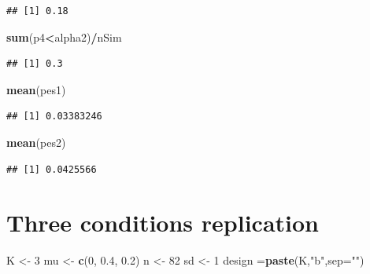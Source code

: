 \documentclass[]{book}
\newenvironment{Shaded}{\begin{snugshade}}{\end{snugshade}}
\newcommand{\DataTypeTok}[1]{\textcolor[rgb]{0.13,0.29,0.53}{#1}}
\newcommand{\DecValTok}[1]{\textcolor[rgb]{0.00,0.00,0.81}{#1}}
\newcommand{\FloatTok}[1]{\textcolor[rgb]{0.00,0.00,0.81}{#1}}
\newcommand{\KeywordTok}[1]{\textcolor[rgb]{0.13,0.29,0.53}{\textbf{#1}}}
\newcommand{\NormalTok}[1]{#1}
\newcommand{\OperatorTok}[1]{\textcolor[rgb]{0.81,0.36,0.00}{\textbf{#1}}}
\newcommand{\StringTok}[1]{\textcolor[rgb]{0.31,0.60,0.02}{#1}}
\begin{document}
\begin{verbatim}
## [1] 0.18
\end{verbatim}

\begin{Shaded}
\begin{Highlighting}[]
\KeywordTok{sum}\NormalTok{(p4}\OperatorTok{<}\NormalTok{alpha2)}\OperatorTok{/}\NormalTok{nSim}
\end{Highlighting}
\end{Shaded}

\begin{verbatim}
## [1] 0.3
\end{verbatim}

\begin{Shaded}
\begin{Highlighting}[]
\KeywordTok{mean}\NormalTok{(pes1)}
\end{Highlighting}
\end{Shaded}

\begin{verbatim}
## [1] 0.03383246
\end{verbatim}

\begin{Shaded}
\begin{Highlighting}[]
\KeywordTok{mean}\NormalTok{(pes2)}
\end{Highlighting}
\end{Shaded}

\begin{verbatim}
## [1] 0.0425566
\end{verbatim}

\hypertarget{three-conditions-replication-2}{%
\section{Three conditions replication}\label{three-conditions-replication-2}}

\begin{Shaded}
\begin{Highlighting}[]
\NormalTok{K <-}\StringTok{ }\DecValTok{3}
\NormalTok{mu <-}\StringTok{ }\KeywordTok{c}\NormalTok{(}\DecValTok{0}\NormalTok{, }\FloatTok{0.4}\NormalTok{, }\FloatTok{0.2}\NormalTok{)}
\NormalTok{n <-}\StringTok{ }\DecValTok{82}
\NormalTok{sd <-}\StringTok{ }\DecValTok{1}
\NormalTok{design =}\KeywordTok{paste}\NormalTok{(K,}\StringTok{"b"}\NormalTok{,}\DataTypeTok{sep=}\StringTok{""}\NormalTok{)}
\end{Highlighting}
\end{Shaded}
\end{document}

